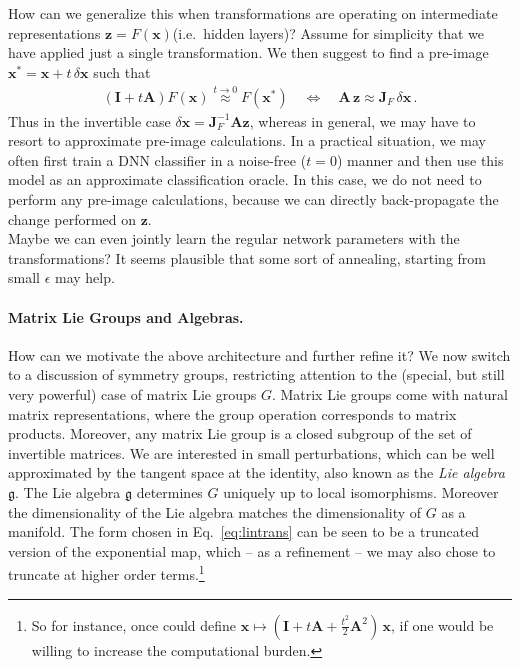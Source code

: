 \documentclass{article}
\newcommand{\mat}[1]{{\mathbf #1}}
\newcommand{\x}{{\mathbf x}}
\newcommand{\z}{{\mathbf z}}
\begin{document}
How can we generalize this when transformations are operating on intermediate representations $\z = F(\x)$(i.e.~hidden layers)? Assume for simplicity that we have applied just a single transformation. We then suggest to find a pre-image $\x^* = \x + t \, \delta \x$ such that 
\begin{align}
( \mat I + t \mat A) F(\x) \stackrel {t\to 0}\approx F(\x^*) \quad  \iff \quad \mat A \, \z \approx \mat J_F \, \delta\x\,.
\end{align}
Thus in the invertible case $\delta \x = \mat J_F^{-1} \mat A\z$, whereas in general, we may have to resort to approximate pre-image calculations. In a practical situation, we may often first train a DNN classifier in a noise-free ($t=0$) manner and then use this model as an approximate classification oracle. In this case, we do not need to perform any pre-image calculations, because we can directly back-propagate the change performed on $\z$. \\

Maybe we can even jointly learn the regular network parameters with the transformations? It seems plausible that some sort of annealing, starting from small $\epsilon$ may help. 


\paragraph{Matrix Lie Groups and Algebras.} How can we motivate the above architecture and further refine it? We now switch to a discussion of symmetry groups, restricting attention to the (special, but still very powerful) case of matrix Lie groups $G$. Matrix Lie groups come with natural matrix representations, where the group operation corresponds to matrix products. Moreover, any matrix Lie group is a closed subgroup of the set of invertible matrices. We are interested in small perturbations, which can be well approximated by the tangent space at the identity, also known as the \textit{Lie algebra} $\mathfrak{g}$. The Lie algebra $\mathfrak g$ determines $G$ uniquely up to local isomorphisms. Moreover the dimensionality of the Lie algebra matches the dimensionality of $G$ as a manifold. The form chosen in Eq.~\eqref{eq:lintrans} can be seen to be a truncated version of the exponential map, which -- as a refinement -- we may also chose to truncate at higher order terms.\footnote{So for instance, once could define $\x \mapsto (\mat I + t \mat A + \frac{t^2}{2} \mat A^2) \, \x$, if one would be willing to increase the computational burden.}
\end{document}

